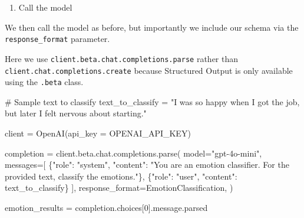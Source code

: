 \documentclass[
  letterpaper,
  DIV=11,
  numbers=noendperiod]{scrreprt}
\newenvironment{Shaded}{\begin{snugshade}}{\end{snugshade}}
\newcommand{\CommentTok}[1]{\textcolor[rgb]{0.37,0.37,0.37}{#1}}
\newcommand{\DecValTok}[1]{\textcolor[rgb]{0.68,0.00,0.00}{#1}}
\newcommand{\NormalTok}[1]{\textcolor[rgb]{0.00,0.23,0.31}{#1}}
\newcommand{\OperatorTok}[1]{\textcolor[rgb]{0.37,0.37,0.37}{#1}}
\newcommand{\StringTok}[1]{\textcolor[rgb]{0.13,0.47,0.30}{#1}}
\providecommand{\tightlist}{%
  \setlength{\itemsep}{0pt}\setlength{\parskip}{0pt}}\usepackage{longtable,booktabs,array}
\begin{document}
\begin{enumerate}
\def\labelenumi{\arabic{enumi}.}
\setcounter{enumi}{1}
\tightlist
\item
  Call the model
\end{enumerate}

We then call the model as before, but importantly we include our schema
via the \texttt{response\_format} parameter.

\begin{tcolorbox}[enhanced jigsaw, opacitybacktitle=0.6, breakable, title=\textcolor{quarto-callout-note-color}{\faInfo}\hspace{0.5em}{Note}, arc=.35mm, colframe=quarto-callout-note-color-frame, colbacktitle=quarto-callout-note-color!10!white, left=2mm, bottomrule=.15mm, opacityback=0, toprule=.15mm, bottomtitle=1mm, toptitle=1mm, titlerule=0mm, leftrule=.75mm, colback=white, rightrule=.15mm, coltitle=black]

Here we use \texttt{client.beta.chat.completions.parse} rather than
\texttt{client.chat.completions.create} because Structured Output is
only available using the \texttt{.beta} class.

\end{tcolorbox}

\begin{Shaded}
\begin{Highlighting}[]
\CommentTok{\# Sample text to classify}
\NormalTok{text\_to\_classify }\OperatorTok{=} \StringTok{"I was so happy when I got the job, but later I felt nervous about starting."}

\NormalTok{client }\OperatorTok{=}\NormalTok{ OpenAI(api\_key }\OperatorTok{=}\NormalTok{ OPENAI\_API\_KEY)}

\NormalTok{completion }\OperatorTok{=}\NormalTok{ client.beta.chat.completions.parse(}
\NormalTok{    model}\OperatorTok{=}\StringTok{"gpt{-}4o{-}mini"}\NormalTok{,}
\NormalTok{    messages}\OperatorTok{=}\NormalTok{[}
\NormalTok{        \{}\StringTok{"role"}\NormalTok{: }\StringTok{"system"}\NormalTok{, }\StringTok{"content"}\NormalTok{: }\StringTok{"You are an emotion classifier. For the provided text, classify the emotions."}\NormalTok{\},}
\NormalTok{        \{}\StringTok{"role"}\NormalTok{: }\StringTok{"user"}\NormalTok{, }\StringTok{"content"}\NormalTok{: text\_to\_classify\}}
\NormalTok{    ],}
\NormalTok{    response\_format}\OperatorTok{=}\NormalTok{EmotionClassification,}
\NormalTok{)}

\NormalTok{emotion\_results }\OperatorTok{=}\NormalTok{ completion.choices[}\DecValTok{0}\NormalTok{].message.parsed}
\end{Highlighting}
\end{Shaded}
\end{document}
